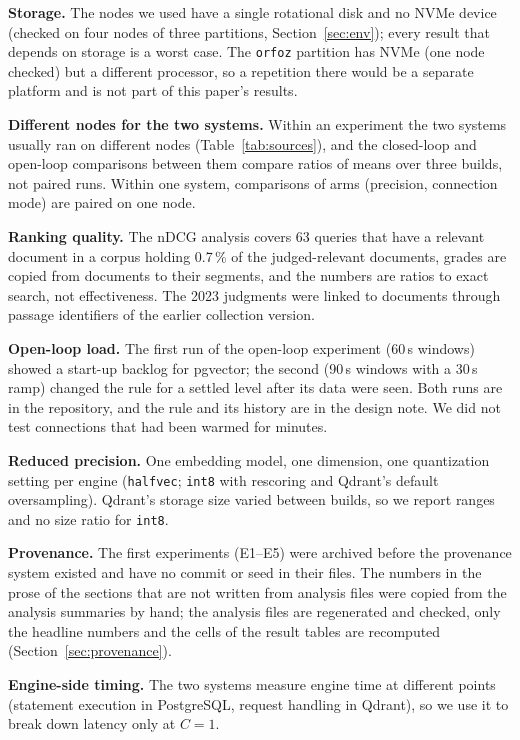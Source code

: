\documentclass[preprint,12pt]{elsarticle}
\begin{document}
\textbf{Storage.} The nodes we used have a single rotational disk and no NVMe device (checked on four nodes of three partitions, Section~\ref{sec:env}); every result that depends on storage is a worst case. The \texttt{orfoz} partition has NVMe (one node checked) but a different processor, so a repetition there would be a separate platform and is not part of this paper's results.

\textbf{Different nodes for the two systems.} Within an experiment the two systems usually ran on different nodes (Table~\ref{tab:sources}), and the closed-loop and open-loop comparisons between them compare ratios of means over three builds, not paired runs. Within one system, comparisons of arms (precision, connection mode) are paired on one node.

\textbf{Ranking quality.} The nDCG analysis covers 63 queries that have a relevant document in a corpus holding 0.7\,\% of the judged-relevant documents, grades are copied from documents to their segments, and the numbers are ratios to exact search, not effectiveness. The 2023 judgments were linked to documents through passage identifiers of the earlier collection version.

\textbf{Open-loop load.} The first run of the open-loop experiment (60\,s windows) showed a start-up backlog for pgvector; the second (90\,s windows with a 30\,s ramp) changed the rule for a settled level after its data were seen. Both runs are in the repository, and the rule and its history are in the design note. We did not test connections that had been warmed for minutes.

\textbf{Reduced precision.} One embedding model, one dimension, one quantization setting per engine (\texttt{halfvec}; \texttt{int8} with rescoring and Qdrant's default oversampling). Qdrant's storage size varied between builds, so we report ranges and no size ratio for \texttt{int8}.

\textbf{Provenance.} The first experiments (E1--E5) were archived before the provenance system existed and have no commit or seed in their files. The numbers in the prose of the sections that are not written from analysis files were copied from the analysis summaries by hand; the analysis files are regenerated and checked, only the headline numbers and the cells of the result tables are recomputed (Section~\ref{sec:provenance}).

\textbf{Engine-side timing.} The two systems measure engine time at different points
(statement execution in PostgreSQL, request handling in Qdrant), so we use it to break
down latency only at $C=1$.
\end{document}
